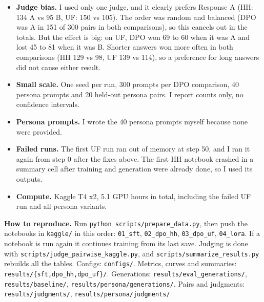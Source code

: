 \documentclass[10pt,a4paper]{article}
\begin{document}
\begin{itemize}
\item \textbf{Judge bias.} I used only one judge, and it clearly prefers Response A (HH: 134 A vs 95 B, UF: 150 vs 105).
The order was random and balanced (DPO was A in 151 of 300 pairs in both comparisons), so this cancels out in the totals.
But the effect is big: on UF, DPO won 69 to 60 when it was A and lost 45 to 81 when it was B. Shorter answers won more
often in both comparisons (HH 129 vs 98, UF 139 vs 114), so a preference for long answers did not cause either result.
\item \textbf{Small scale.} One seed per run, 300 prompts per DPO comparison, 40 persona prompts and 20 held-out persona
pairs. I report counts only, no confidence intervals.
\item \textbf{Persona prompts.} I wrote the 40 persona prompts myself because none were provided.
\item \textbf{Failed runs.} The first UF run ran out of memory at step 50, and I ran it again from step 0 after the fixes
above. The first HH notebook crashed in a summary cell after training and generation were already done, so I used its
outputs.
\item \textbf{Compute.} Kaggle T4 x2, 5.1 GPU hours in total, including the failed UF run and all persona variants.
\end{itemize}

\textbf{How to reproduce.} Run \texttt{python scripts/prepare\_data.py}, then push the notebooks in \texttt{kaggle/} in
this order: \texttt{01\_sft}, \texttt{02\_dpo\_hh}, \texttt{03\_dpo\_uf}, \texttt{04\_lora}. If a notebook is run again it
continues training from its last save. Judging is done with \texttt{scripts/judge\_pairwise\_kaggle.py}, and
\texttt{scripts/summarize\_results.py} rebuilds all the tables. Configs: \texttt{configs/}. Metrics, curves and summaries:
\texttt{results/\{sft,dpo\_hh,dpo\_uf\}/}. Generations: \texttt{results/eval\_generations/},
\texttt{results/baseline/}, \texttt{results/persona/generations/}. Pairs and judgments: \texttt{results/judgments/},
\texttt{results/persona/judgments/}.
\end{document}
